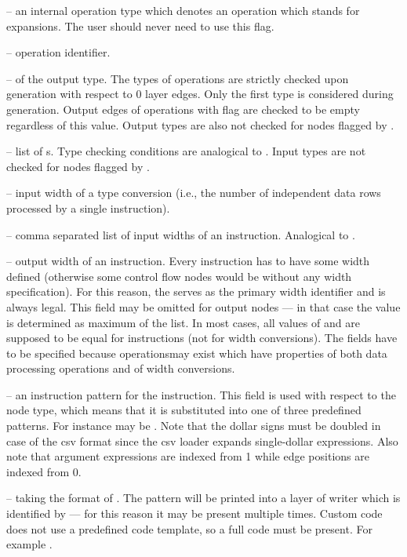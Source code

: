 \begin{description}
\begin{description}
    \item {} -- an internal operation type which denotes an operation which stands for expansions. The user should never need to use this flag.
  \end{description}
  \item{} -- operation identifier.
  \item{} --  of the output type. The types of operations are strictly checked upon generation with respect to 0 layer edges. Only the first type is considered during generation. Output edges of operations with  flag are checked to be empty regardless of this value. Output types are also not checked for nodes flagged by .
  \item{} -- list of s. Type checking conditions are analogical to . Input types are not checked for nodes flagged by .
\item{} -- input width of a type conversion (i.e., the number of independent data rows processed by a single instruction).
\item{} -- comma separated list of input widths of an instruction. Analogical to .
\item{} -- output width of an instruction. Every instruction has to have some width defined (otherwise some control flow nodes would be without any width specification). For this reason, the  serves as the primary width identifier and is always legal. This field may be omitted for output nodes --- in that case the value is determined as maximum of the  list. In most cases, all values of  and  are supposed to be equal for instructions (not for width conversions). The fields have to be specified because operationsmay exist which have properties of both data processing operations and of width conversions.
  \item{} -- an instruction pattern for the instruction. This field is used with respect to the node type, which means that it is substituted into one of three predefined patterns. For instance  may be . Note that the dollar signs must be doubled in case of the csv format since the csv loader expands single-dollar expressions. Also note that argument expressions are indexed from 1 while edge positions are indexed from 0.
  \item{} -- taking the format of  . The pattern will be printed into a layer of writer which is identified by  --- for this reason it may be present multiple times. Custom code does not use a predefined code template, so a full code must be present. For example .
\end{description}

